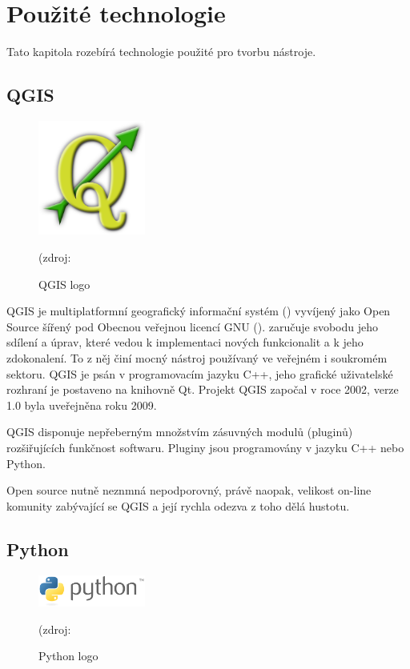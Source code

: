 \chapter{Použité technologie}
\label{3-technologie}

Tato kapitola rozebírá technologie použité pro tvorbu nástroje.
\section{QGIS}

\begin{figure}[H]
    \centering
      \includegraphics[width=100pt]{./pictures/qgis.png}
      \caption[QGIS logo]{QGIS logo}(zdroj: %
      \label{fig:qgis}
  \end{figure}
 
QGIS je multiplatformní geografický informační systém () vyvíjený jako Open Source šířený pod Obecnou veřejnou licencí GNU ().  zaručuje svobodu jeho sdílení a úprav, které vedou k implementaci nových funkcionalit a k jeho zdokonalení. To z něj činí mocný nástroj používaný ve veřejném i soukromém sektoru. QGIS je psán v programovacím jazyku C++, jeho grafické uživatelské rozhraní je postaveno na knihovně Qt. Projekt QGIS započal v roce 2002, verze 1.0 byla uveřejněna roku 2009. 

QGIS disponuje nepřeberným množstvím zásuvných modulů (pluginů) rozšiřujících funkčnost softwaru. Pluginy jsou programovány v jazyku C++ nebo Python. 

Open source nutně neznmná nepodporovný, právě naopak, velikost on-line komunity zabývající se QGIS a její rychla odezva z toho dělá hustotu.



\section{Python}
\begin{figure}[H]
    \centering
      \includegraphics[width=100pt]{./pictures/python.png}
      \caption[Python logo]{Python logo}(zdroj: %
      \label{fig:python}
  \end{figure}
  
